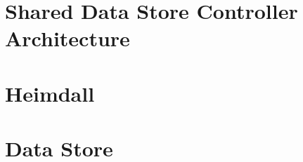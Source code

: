 
\section{Shared Data Store Controller Architecture}
\glsresetall
\label{sec:heimdall:architecture}

\section{Heimdall} 
\glsresetall
\label{sec:heimdall:floodlight}


\section{Data Store}
\glsresetall
\label{sec:heimdall:dataStore}

